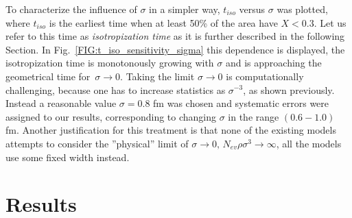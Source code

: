 To characterize the influence of $\sigma$ in a simpler way, $t_{iso}$ versus
$\sigma$ was plotted, where $t_{iso}$ is the earliest time when at least 50\%
of the area have $X < 0.3$. Let us refer to this time as \emph{isotropization time}
as it is further described in the following Section. In
Fig.~\ref{FIG:t_iso_sensitivity_sigma} this dependence is displayed, the
isotropization time is monotonously growing with $\sigma$ and is approaching
the geometrical time for~$\sigma \to 0$. Taking the limit $\sigma \to 0$ is
computationally challenging, because one has to increase statistics as
$\sigma^{-3}$, as shown previously. Instead a reasonable value $\sigma = 0.8$
fm was chosen and systematic errors were assigned to our results, corresponding
to changing $\sigma$ in the range $(0.6-1.0)$ fm. Another justification for
this treatment is that none of the existing models attempts to consider the
''physical'' limit of $\sigma \to 0,\, N_{ev} \rho \sigma^3 \to \infty$, all
the models use some fixed width instead.

\section{Results} \label{sec:Results}

